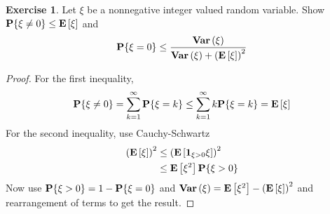 \documentclass{amsart}
\theoremstyle{remark}
\theoremstyle{definition}
\newtheorem{ex}[thm]{Exercise}
\begin{document}
\begin{ex}Let $\xi$ be a nonnegative integer valued random variable.
  Show $\textbf{P}\{\xi \neq 0\} \leq \textbf{E}\left[\xi\right]$ and 
\begin{align*}
\textbf{P}\{\xi = 0\} \leq \frac{\textbf{Var} \left (\xi \right )}{\textbf{Var} \left (\xi \right ) + \left(\textbf{E}\left[\xi\right]\right)^2}
\end{align*}
\end{ex}
\begin{proof}
For the first inequality,
\begin{align*}
\textbf{P}\{\xi \neq 0\} = \sum_{k=1}^\infty \textbf{P}\{\xi = k\} \leq
\sum_{k=1}^\infty k\textbf{P}\{\xi = k\} = \textbf{E}\left[\xi\right]
\end{align*}
For the second inequality, use Cauchy-Schwartz
\begin{align*}
\left(\textbf{E}\left[\xi\right]\right)^2 &\leq
\left(\textbf{E}\left[\textbf{1}_{\xi > 0}\xi\right]\right)^2 \\
&\leq \textbf{E}\left[\xi^2\right] \textbf{P}\{\xi > 0\}
\end{align*}
Now use $\textbf{P}\{\xi > 0\} = 1 - \textbf{P}\{\xi=0\}$ and
$\textbf{Var} \left (\xi \right ) = \textbf{E}\left[\xi^2\right] -
\left(\textbf{E}\left[\xi\right]\right)^2$ and rearrangement of terms to get
the result.
\end{proof}
\end{document}
